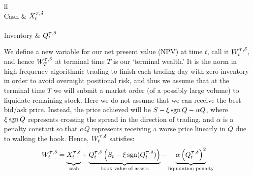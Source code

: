 \begin{longtable}{ll}
 \vspace{6pt} \\ 
Cash & $X^{\bm{\tau}, \delta}_t$ \\
  \vspace{6pt} \\ 
Inventory & $Q^{\bm{\tau}, \delta}_t$ \\
\end{longtable}

We define a new variable for our net present value (NPV) at time $t$, call it $W^{\bm{\tau}, \delta}_t$, and hence $W^{\bm{\tau}, \delta}_T$ at terminal time $T$ is our `terminal wealth.' It is the norm in high-frequency algorithmic trading to finish each trading day with zero inventory in order to avoid overnight positional risk, and thus we assume that at the terminal time $T$ we will submit a market order (of a possibly large volume) to liquidate remaining stock. Here we do not assume that we can receive the best bid/ask price. Instead, the price achieved will be $S - \xi \operatorname{\mathrm{sgn}} Q - \alpha Q$, where $\xi \operatorname{\mathrm{sgn}} Q$ represents crossing the spread in the direction of trading, and $\alpha$ is a penalty constant so that $\alpha Q$ represents receiving a worse price linearly in $Q$ due to walking the book. Hence, $W^{\bm{\tau}, \delta}_t$ satisfies:
\begin{equation}\label{eq:terminalwealth}
W^{\btau, \delta}_t = \underbrace{\vphantom{\left( Q^{\btau, \delta}_t) \right)}X^{\btau, \delta}_t}_{\text{cash}}+ \underbrace{Q^{\btau, \delta}_t \left( S_t - \xi \sgn(Q^{\btau, \delta}_t) \right)}_{\text{book value of assets}} - \underbrace{\alpha \left( Q^{\btau, \delta}_t \right)^2}_{\text{liquidation penalty}}
\end{equation}

